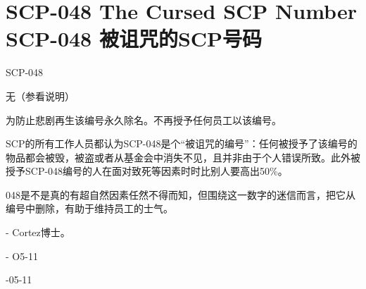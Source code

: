 \chapter[SCP-048 被诅咒的SCP号码]{
    SCP-048 The Cursed SCP Number\\
    SCP-048 被诅咒的SCP号码
}

\label{chap:SCP-048}

SCP-048

 无（参看说明）

为防止悲剧再生该编号永久除名。不再授予任何员工以该编号。

SCP的所有工作人员都认为SCP-048是个“被诅咒的编号”：任何被授予了该编号的物品都会被毁，被盗或者从基金会中消失不见，且并非由于个人错误所致。此外被授予SCP-048编号的人在面对致死等因素时时比别人要高出50\%。

048是不是真的有超自然因素任然不得而知，但围绕这一数字的迷信而言，把它从编号中删除，有助于维持员工的士气。

 - Cortez博士。

 - O5-11

-05-11
